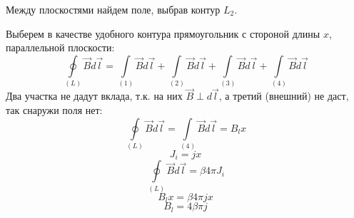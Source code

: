 \documentclass[a4paper,14pt]{extarticle}
\begin{document}
Между плоскостями найдем поле, выбрав контур $L_2$.

Выберем в качестве удобного контура прямоугольник с стороной длины $x$, параллельной плоскости:
\begin{equation}
    \oint\limits_{(L)} \vec{B}d\vec{l}= 
    \int\limits_{(1)} \vec{B}d\vec{l}+
    \int\limits_{(2)} \vec{B}d\vec{l}+
    \int\limits_{(3)} \vec{B}d\vec{l}+
    \int\limits_{(4)} \vec{B}d\vec{l}
\end{equation}
Два участка не дадут вклада, т.к. на них $\vec{B}\perp d \vec{l}$, а третий (внешний) не даст, так снаружи поля нет:
\begin{equation}
    \oint\limits_{(L)} \vec{B}d\vec{l}= 
    \int\limits_{(4)} \vec{B}d\vec{l}=B_l x
\end{equation}
\begin{equation}
    J_i=jx
\end{equation}
\begin{equation}
    \oint\limits_{(L)} \vec{B}d\vec{l}=
    \beta 4\pi J_i
\end{equation}
\begin{equation}
    B_l x=\beta 4\pi j x
\end{equation}
\begin{equation}
    B_l=4\beta\pi j
\end{equation}
\end{document}
